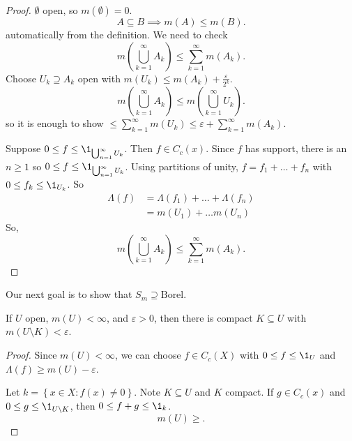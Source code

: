 \begin{proof}
	$\emptyset$ open, so $m(\emptyset) = 0$.
	\[
		A \subseteq B \implies m(A) \leq m(B).
	\]
	automatically from the definition.
	We need to check
	\[
		m \left(\bigcup_{k = 1}^{\infty} A_k \right) \leq \sum_{k = 1}^{\infty} m(A_k).
	\]
	Choose $U_k \supseteq A_k$ open with $m(U_k) \leq m(A_k) + \frac{\varepsilon}{2^k}$.
	\[
		m \left(\bigcup_{k = 1}^{\infty} A_k \right) \leq m \left( \bigcup_{k = 1}^{\infty} U_k \right).
	\]
	so it is enough to show $\leq \sum_{k = 1}^{\infty} m(U_k) \leq \varepsilon + \sum_{k = 1}^{\infty} m(A_k)$.

	Suppose $0 \leq f \leq \1_{\bigcup_{n = 1}^{\infty} U_k}$. Then $f \in C_{c}(x)$.
	Since $f$ has support, there is an $n \geq 1$ so $0 \leq f \leq \1_{\bigcup_{n = 1}^{\infty} U_k}$.
	Using partitions of unity, $f = f_1 + \ldots + f_n$ with $0 \leq f_k \leq \1_{U_k}$. So
	\begin{align*}
		\Lambda(f) & = \Lambda(f_1) + \ldots + \Lambda(f_n) \\
							 & = m(U_1) + \ldots m(U_n)
	\end{align*}
	So,
	\[
		m \left(\bigcup_{k = 1}^{\infty} A_k \right) \leq \sum_{k = 1}^{\infty} m(A_k).
	\]
\end{proof}

Our next goal is to show that $S_m \supseteq \textrm{Borel}$.

\begin{lemma}
  If $U$ open, $m(U) < \infty$, and $\varepsilon > 0$, then there is compact $K \subseteq U$ with $m(U \setminus K) < \varepsilon$.
\end{lemma}

\begin{proof}
	Since $m(U) < \infty$, we can choose $f \in C_c(X)$ with $0 \leq f \leq \1_U$ 
	and $\Lambda(f) \geq m(U) - \varepsilon$.

	\noindent Let $k = \left\{x \in X : f(x) \neq 0 \right\}$. Note $K \subseteq U$ and $K$ compact. 
	If $g \in C_c(x)$ and $0 \leq g \leq \1_{U \setminus K}$, then $0 \leq f + g \leq \1_k$. 
	\[
		m(U) \geq.
	\]
\end{proof}


